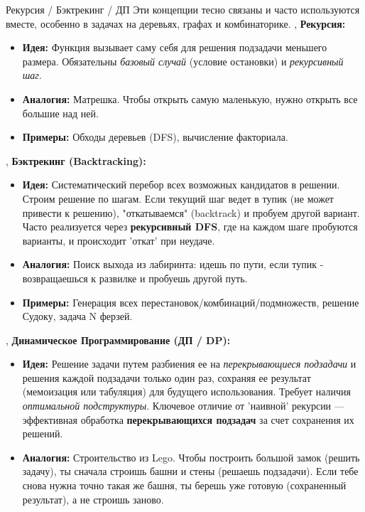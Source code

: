 \begin{alerttextbox}{Рекурсия / Бэктрекинг / ДП}
    Эти концепции тесно связаны и часто используются вместе, особенно в задачах на деревьях, графах и комбинаторике. \sep
    \textbf{Рекурсия:}
    \begin{itemize}[nosep, leftmargin=*]
        \item \textbf{Идея:} Функция вызывает саму себя для решения подзадачи меньшего размера. Обязательны \textit{базовый случай} (условие остановки) и \textit{рекурсивный шаг}.
        \item \textbf{Аналогия:} Матрешка. Чтобы открыть самую маленькую, нужно открыть все большие над ней.
        \item \textbf{Примеры:} Обходы деревьев (DFS), вычисление факториала.
    \end{itemize} \sep
    \textbf{Бэктрекинг (Backtracking):}
    \begin{itemize}[nosep, leftmargin=*]
        \item \textbf{Идея:} Систематический перебор всех возможных кандидатов в решении. Строим решение по шагам. Если текущий шаг ведет в тупик (не может привести к решению), "откатываемся" (backtrack) и пробуем другой вариант. Часто реализуется через \textbf{рекурсивный DFS}, где на каждом шаге пробуются варианты, и происходит 'откат' при неудаче.
        \item \textbf{Аналогия:} Поиск выхода из лабиринта: идешь по пути, если тупик - возвращаешься к развилке и пробуешь другой путь.
        \item \textbf{Примеры:} Генерация всех перестановок/комбинаций/подмножеств, решение Судоку, задача N ферзей.
    \end{itemize} \sep
    \textbf{Динамическое Программирование (ДП / DP):}
    \begin{itemize}[nosep, leftmargin=*]
        \item \textbf{Идея:} Решение задачи путем разбиения ее на \textit{перекрывающиеся подзадачи} и решения каждой подзадачи только один раз, сохраняя ее результат (мемоизация или табуляция) для будущего использования. Требует наличия \textit{оптимальной подструктуры}. Ключевое отличие от 'наивной' рекурсии — эффективная обработка \textbf{перекрывающихся подзадач} за счет сохранения их решений.
        \item \textbf{Аналогия:} Строительство из Lego. Чтобы построить большой замок (решить задачу), ты сначала строишь башни и стены (решаешь подзадачи). Если тебе снова нужна точно такая же башня, ты берешь уже готовую (сохраненный результат), а не строишь заново.

\end{itemize}
\end{alerttextbox}
